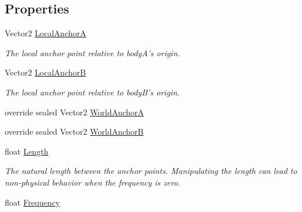 \subsection*{Properties}
\begin{DoxyCompactItemize}
\item 
Vector2 \hyperlink{class_farseer_physics_1_1_dynamics_1_1_joints_1_1_distance_joint_a413bedd4b2a83a40f4f21e11af7f874e}{Local\+Anchor\+A}
\begin{DoxyCompactList}\small\item\em The local anchor point relative to body\+A's origin. \end{DoxyCompactList}\item 
Vector2 \hyperlink{class_farseer_physics_1_1_dynamics_1_1_joints_1_1_distance_joint_a0c6cadd6fc2530aa6e9f8bd4e2ff96ee}{Local\+Anchor\+B}
\begin{DoxyCompactList}\small\item\em The local anchor point relative to body\+B's origin. \end{DoxyCompactList}\item 
override sealed Vector2 \hyperlink{class_farseer_physics_1_1_dynamics_1_1_joints_1_1_distance_joint_a73d5dda2d75827c8db82f3bb6afd6a22}{World\+Anchor\+A}
\item 
override sealed Vector2 \hyperlink{class_farseer_physics_1_1_dynamics_1_1_joints_1_1_distance_joint_a029f97b0fb298ceecd3fa954ce1959cd}{World\+Anchor\+B}
\item 
float \hyperlink{class_farseer_physics_1_1_dynamics_1_1_joints_1_1_distance_joint_a7969ab7392686edf98105b7d9291b1e6}{Length}
\begin{DoxyCompactList}\small\item\em The natural length between the anchor points. Manipulating the length can lead to non-\/physical behavior when the frequency is zero. \end{DoxyCompactList}\item 
float \hyperlink{class_farseer_physics_1_1_dynamics_1_1_joints_1_1_distance_joint_a2e450173bb17de6a0c34418c0b90cd6e}{Frequency}

\end{DoxyCompactItemize}
